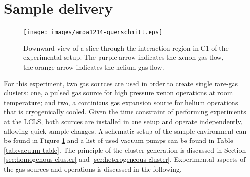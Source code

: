 \section{Sample delivery}\label{sec:sample-delivery}
\begin{figure}
	\centering
		\texttt{[image: images/amoa1214-querschnitt.eps]}
	\caption[Sideview of double sample jet configuration.]{Downward view of a slice through the interaction region in C1 of the experimental setup. The purple arrow indicates the xenon gas flow, the orange arrow indicates the helium gas flow.}
	\label{fig:Overview-Jetalignment}
\end{figure}
For this experiment, two gas sources are used in order to create single rare-gas clusters: one, a pulsed gas source for high pressure xenon operations at room temperature; and two, a continious gas expansion source for helium operations that is cryogenically cooled. Given the time constraint of performing experiments at the LCLS, both sources are installed in one setup and operate independently, allowing quick sample changes. A schematic setup of the sample environment can be found in Figure \ref{fig:Overview-Jetalignment} and a list of used vacuum pumps can be found in Table \ref{tab:vacuum-table}. The principle of the cluster generation is discussed in Section \ref{sec:homogenous-cluster} and \ref{sec:heterogeneous-cluster}. Experimental aspects of the gas sources and operations is discussed in the following.\\[1\baselineskip]
